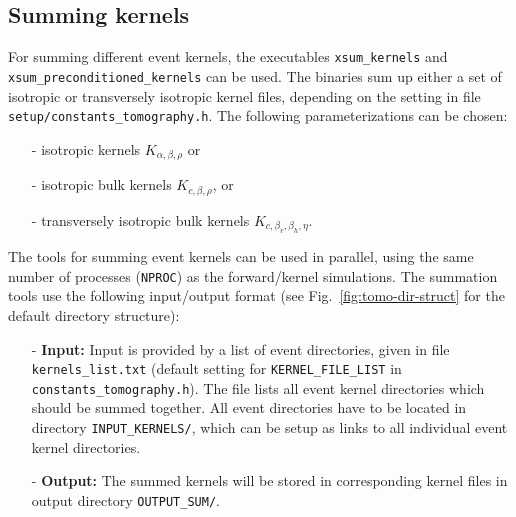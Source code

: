 \subsection{Summing kernels}

For summing different event kernels, the executables \texttt{xsum\_kernels} and \texttt{xsum\_preconditioned\_kernels} can be used.
The binaries sum up either a set of isotropic or transversely isotropic kernel files, depending on the setting in file \texttt{setup/constants\_tomography.h}.
The following parameterizations can be chosen:
\begin{enumerate}
\item [-] isotropic kernels $K_{\alpha,\beta,\rho}$ or
\item [-] isotropic bulk kernels $K_{c,\beta,\rho}$, or
\item [-] transversely isotropic bulk kernels $K_{c,\beta_v,\beta_h,\eta}$.
\end{enumerate}

\noindent
The tools for summing event kernels can be used in parallel, using the same number of processes (\texttt{NPROC}) as the forward/kernel simulations.
The summation tools use the following input/output format (see Fig.~\ref{fig:tomo-dir-struct} for the default directory structure):
\begin{itemize}
\item [-]{\bf Input:}
Input is provided by a list of event directories, given in file \texttt{kernels\_list.txt} (default setting for \texttt{KERNEL\_FILE\_LIST} in \texttt{constants\_tomography.h}). The file lists all event kernel directories which should be summed together. All event directories have to be located in directory \texttt{INPUT\_KERNELS/}, which can be setup as links to all individual event kernel directories.

\item [-]{\bf Output:}
The summed kernels will be stored in corresponding kernel files in output directory \texttt{OUTPUT\_SUM/}.\newline
\end{itemize}

